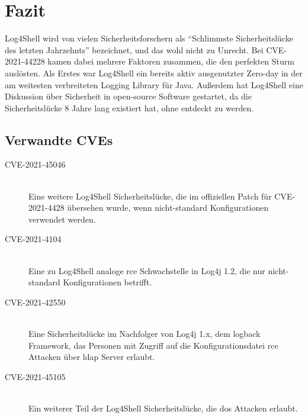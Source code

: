 
\section{Fazit}\label{sec:fazit}
Log4Shell wird von vielen Sicherheitsforschern als ``Schlimmste Sicherheitslücke des letzten Jahrzehnts'' bezeichnet, und das wohl nicht zu Unrecht.
Bei CVE-2021-44228 kamen dabei mehrere Faktoren zusammen, die den perfekten Sturm auslösten.
Als Erstes war Log4Shell ein bereits aktiv ausgenutzter Zero-day in der am weitesten verbreiteten Logging Library für Java.
Außerdem hat Log4Shell eine Diskussion über Sicherheit in open-source Software gestartet, da die Sicherheitslücke 8 Jahre lang existiert hat, ohne entdeckt zu werden.

\subsection{Verwandte CVEs}\label{subsec:weiteres}
\begin{description}
    \item[CVE-2021-45046]\hfill \\Eine weitere Log4Shell Sicherheitslücke, die im offiziellen Patch für CVE-2021-4428 übersehen wurde, wenn nicht-standard Konfigurationen verwendet werden.
    \item[CVE-2021-4104]\hfill \\Eine zu Log4Shell analoge \gls{rce} Schwachstelle in Log4j 1.2, die nur nicht-standard Konfigurationen betrifft.
    \item[CVE-2021-42550]\hfill \\Eine Sicherheitslücke im Nachfolger von Log4j 1.x, dem logback Framework, das Personen mit Zugriff auf die Konfigurationsdatei \gls{rce} Attacken über \gls{ldap} Server erlaubt.
    \item[CVE-2021-45105]\hfill \\Ein weiterer Teil der Log4Shell Sicherheitslücke, die \gls{dos} Attacken erlaubt.
\end{description}
